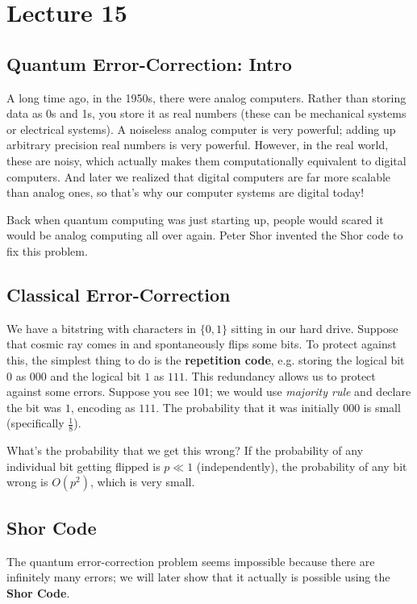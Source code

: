 \section{Lecture 15}

\subsection{Quantum Error-Correction: Intro}
A long time ago, in the 1950s, there were analog computers. Rather than storing data as
0s and 1s, you store it as real numbers (these can be mechanical systems or electrical systems).
A noiseless analog computer is very powerful; adding up arbitrary precision real numbers is very powerful.
However, in the real world, these are noisy, which actually makes them computationally equivalent to digital computers. 
And later we realized that digital computers are far more scalable than analog ones, so that's why our computer systems are digital today!

Back when quantum computing was just starting up, people would scared it would be analog computing all over again.
Peter Shor invented the Shor code to fix this problem.

\subsection{Classical Error-Correction}
We have a bitstring with characters in $\{0, 1\}$ sitting in our hard drive. Suppose that cosmic ray comes in
and spontaneously flips some bits. To protect against this, the simplest thing to do is the \textbf{repetition code}, e.g.
storing the logical bit $0$ as $000$ and the logical bit $1$ as $111$. This redundancy allows us to protect
against some errors. Suppose you see $101$; we would use \emph{majority rule} and declare the bit was $1$, encoding as $111$.
The probability that it was initially $000$ is small (specifically $\frac{1}{8}$).

What's the probability that we get this wrong? If the probability of any individual bit getting flipped is $p \ll 1$ (independently),
the probability of any bit wrong is $O(p^2)$, which is very small.

\subsection{Shor Code}
The quantum error-correction problem seems impossible because there are infinitely many errors; we will later show that 
it actually is possible using the \textbf{Shor Code}.

